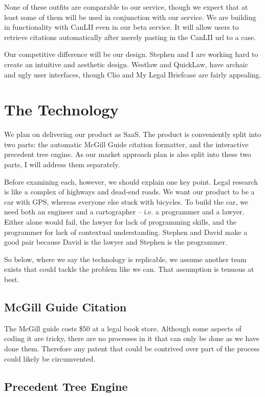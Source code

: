 \documentclass[11pt]{article}
\begin{document}
None of these outfits are comparable to our service, though we expect that at least some of them will be used in conjunction with our service. We are building in functionality with CanLII even in our beta service. It will allow users to retrieve citations automatically after merely pasting in the CanLII url to a case.

Our competitive difference will be our design. Stephen and I are working hard to create an intuitive and aesthetic design. Westlaw and QuickLaw, have archaic and ugly user interfaces, though Clio and My Legal Briefcase are fairly appealing.


\section*{The Technology}

We plan on delivering our product as SaaS. The product is conveniently split into two parts: the automatic McGill Guide citation formatter, and the interactive precedent tree engine. As our market approach plan is also split into these two parts, I will address them separately.

Before examining each, however, we should explain one key point. Legal research is like a complex of highways and dead-end roads. We want our product to be a car with GPS, whereas everyone else stuck with bicycles. To build the car, we need both an engineer and a cartographer -- i.e. a programmer and a lawyer. Either alone would fail, the lawyer for lack of programming skills, and the programmer for lack of contextual understanding. Stephen and David make a good pair because David is the lawyer and Stephen is the programmer. 

So below, where we say the technology is replicable, we assume another team exists that could tackle the problem like we can. That assumption is tenuous at best.


\subsection*{McGill Guide Citation}

The McGill guide costs \$50 at a legal book store. Although some aspects of coding it are tricky, there are no processes in it that can only be done as we have done them. Therefore any patent that could be contrived over part of the process could likely be circumvented. 


\subsection*{Precedent Tree Engine}
\end{document}
